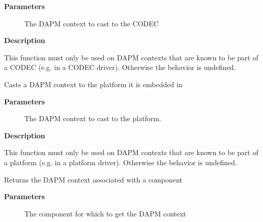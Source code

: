 \documentclass[a4paper,8pt,english]{sphinxmanual}
\begin{document}
\textbf{Parameters}
\begin{description}
\item[{}] \leavevmode
The DAPM context to cast to the CODEC

\end{description}

\textbf{Description}

This function must only be used on DAPM contexts that are known to be part of
a CODEC (e.g. in a CODEC driver). Otherwise the behavior is undefined.

\begin{fulllineitems}
\label{sound/kernel-api/alsa-driver-api:c.snd_soc_dapm_to_platform}
Casts a DAPM context to the platform it is embedded in

\end{fulllineitems}


\textbf{Parameters}
\begin{description}
\item[{}] \leavevmode
The DAPM context to cast to the platform.

\end{description}

\textbf{Description}

This function must only be used on DAPM contexts that are known to be part of
a platform (e.g. in a platform driver). Otherwise the behavior is undefined.

\begin{fulllineitems}
\label{sound/kernel-api/alsa-driver-api:c.snd_soc_component_get_dapm}
Returns the DAPM context associated with a component

\end{fulllineitems}


\textbf{Parameters}
\begin{description}
\item[{}] \leavevmode
The component for which to get the DAPM context

\end{description}
\end{document}
